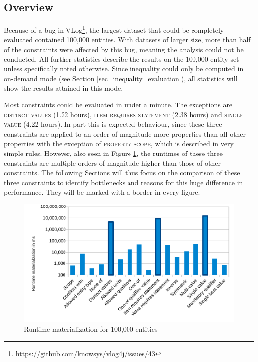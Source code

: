 \documentclass[hyperref,bachelorofscience,fleqn]{cgvpub}
\begin{document}
\subsection{Overview}

Because of a bug in VLog\footnote{\url{https://github.com/knowsys/vlog4j/issues/43}}, the largest dataset that could be completely evaluated contained 100,000 entities. With datasets of larger size, more than half of the constraints were affected by this bug, meaning the analysis could not be conducted. All further statistics describe the results on the 100,000 entity set unless specifically noted otherwise. Since inequality could only be computed in on-demand mode (see Section  \ref{sec_inequality_evaluation}), all statistics will show the results attained in this mode.

Most constraints could be evaluated in under a minute. The exceptions are \textsc{distinct values} (1.22 hours), \textsc{item requires statement} (2.38 hours) and \textsc{single value} (4.22 hours). In part this is expected behaviour, since these three constraints are applied to an order of magnitude more properties than all other properties with the exception of \textsc{property scope}, which is described in very simple rules. However, also seen in Figure \ref{fig_runtime}, the runtimes of these three constraints are multiple orders of magnitude higher than those of other constraints. The following Sections will thus focus on the comparison of these three constraints to identify bottlenecks and reasons for this huge difference in performance. They will be marked with a border in every figure.

\begin{figure}
\includegraphics[width=\linewidth]{images/runtime100,000.pdf}
\caption{Runtime materialization for 100,000 entities}\label{fig_runtime}
\end{figure}
\end{document}
